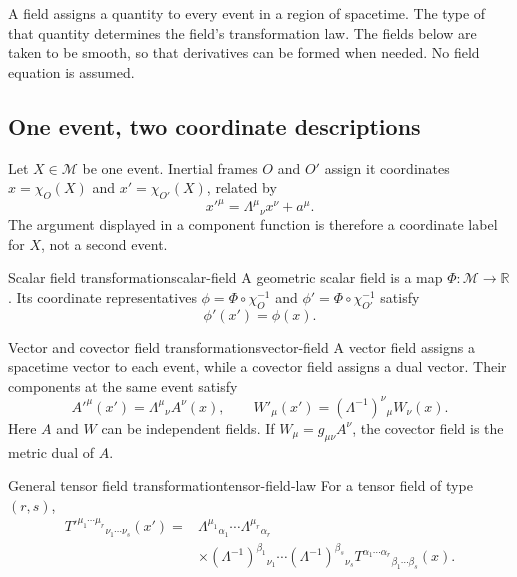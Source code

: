 \documentclass[11pt,a4paper]{article}
\newcommand{\R}{\mathbb{R}}
\begin{document}
A field assigns a quantity to every event in a region of spacetime. The type
of that quantity determines the field's transformation law. The fields below
are taken to be smooth, so that derivatives can be formed when needed. No
field equation is assumed.

\subsection{One event, two coordinate descriptions}

Let \(X\in\mathcal M\) be one event. Inertial frames \(O\) and \(O'\) assign
it coordinates \(x=\chi_O(X)\) and \(x'=\chi_{O'}(X)\), related by
\[
  x'^\mu=\Lambda^\mu{}_\nu x^\nu+a^\mu.
\]
The argument displayed in a component function is therefore a coordinate label
for \(X\), not a second event.

\begin{definition}{Scalar field transformation}{scalar-field}
A geometric scalar field is a map \(\Phi:\mathcal M\to\R\). Its coordinate
representatives \(\phi=\Phi\circ\chi_O^{-1}\) and
\(\phi'=\Phi\circ\chi_{O'}^{-1}\) satisfy
\[
\boxed{\phi'(x')=\phi(x).}
\]
\end{definition}

\begin{definition}{Vector and covector field transformations}{vector-field}
A vector field assigns a spacetime vector to each event, while a covector field
assigns a dual vector. Their components at the same event satisfy
\[
  A'^\mu(x')=\Lambda^\mu{}_\nu A^\nu(x),
  \qquad
  W'_\mu(x')=(\Lambda^{-1})^\nu{}_\mu W_\nu(x).
\]
Here \(A\) and \(W\) can be independent fields. If \(W_\mu=g_{\mu\nu}A^\nu\),
the covector field is the metric dual of \(A\).
\end{definition}

\begin{theorem}{General tensor field transformation}{tensor-field-law}
For a tensor field of type \((r,s)\),
\[
\begin{aligned}
T'^{\mu_1\cdots\mu_r}{}_{\nu_1\cdots\nu_s}(x')
={}&
\Lambda^{\mu_1}{}_{\alpha_1}\cdots
\Lambda^{\mu_r}{}_{\alpha_r}\\
&\times
(\Lambda^{-1})^{\beta_1}{}_{\nu_1}\cdots
(\Lambda^{-1})^{\beta_s}{}_{\nu_s}
T^{\alpha_1\cdots\alpha_r}{}_{\beta_1\cdots\beta_s}(x).
\end{aligned}
\]
\end{theorem}
\end{document}
